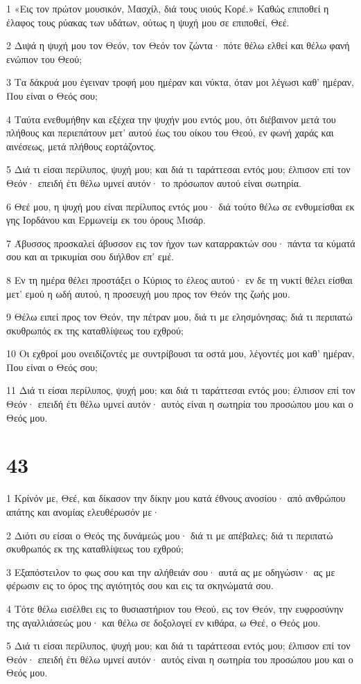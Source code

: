 \par 1 «Εις τον πρώτον μουσικόν, Μασχίλ, διά τους υιούς Κορέ.» Καθώς επιποθεί η έλαφος τους ρύακας των υδάτων, ούτως η ψυχή μου σε επιποθεί, Θεέ.
\par 2 Διψά η ψυχή μου τον Θεόν, τον Θεόν τον ζώντα· πότε θέλω ελθεί και θέλω φανή ενώπιον του Θεού;
\par 3 Τα δάκρυά μου έγειναν τροφή μου ημέραν και νύκτα, όταν μοι λέγωσι καθ' ημέραν, Που είναι ο Θεός σου;
\par 4 Ταύτα ενεθυμήθην και εξέχεα την ψυχήν μου εντός μου, ότι διέβαινον μετά του πλήθους και περιεπάτουν μετ' αυτού έως του οίκου του Θεού, εν φωνή χαράς και αινέσεως, μετά πλήθους εορτάζοντος.
\par 5 Διά τι είσαι περίλυπος, ψυχή μου; και διά τι ταράττεσαι εντός μου; έλπισον επί τον Θεόν· επειδή έτι θέλω υμνεί αυτόν· το πρόσωπον αυτού είναι σωτηρία.
\par 6 Θεέ μου, η ψυχή μου είναι περίλυπος εντός μου· διά τούτο θέλω σε ενθυμείσθαι εκ γης Ιορδάνου και Ερμωνείμ εκ του όρους Μισάρ.
\par 7 Άβυσσος προσκαλεί άβυσσον εις τον ήχον των καταρρακτών σου· πάντα τα κύματά σου και αι τρικυμίαι σου διήλθον επ' εμέ.
\par 8 Εν τη ημέρα θέλει προστάξει ο Κύριος το έλεος αυτού· εν δε τη νυκτί θέλει είσθαι μετ' εμού η ωδή αυτού, η προσευχή μου προς τον Θεόν της ζωής μου.
\par 9 Θέλω ειπεί προς τον Θεόν, την πέτραν μου, διά τι με ελησμόνησας; διά τι περιπατώ σκυθρωπός εκ της καταθλίψεως του εχθρού;
\par 10 Οι εχθροί μου ονειδίζοντές με συντρίβουσι τα οστά μου, λέγοντές μοι καθ' ημέραν, Που είναι ο Θεός σου;
\par 11 Διά τι είσαι περίλυπος, ψυχή μου; και διά τι ταράττεσαι εντός μου; έλπισον επί τον Θεόν· επειδή έτι θέλω υμνεί αυτόν· αυτός είναι η σωτηρία του προσώπου μου και ο Θεός μου.

\chapter{43}

\par 1 Κρίνόν με, Θεέ, και δίκασον την δίκην μου κατά έθνους ανοσίου· από ανθρώπου απάτης και ανομίας ελευθέρωσόν με·
\par 2 Διότι συ είσαι ο Θεός της δυνάμεώς μου· διά τι με απέβαλες; διά τι περιπατώ σκυθρωπός εκ της καταθλίψεως του εχθρού;
\par 3 Εξαπόστειλον το φως σου και την αλήθειάν σου· αυτά ας με οδηγώσιν· ας με φέρωσιν εις το όρος της αγιότητός σου και εις τα σκηνώματά σου.
\par 4 Τότε θέλω εισέλθει εις το θυσιαστήριον του Θεού, εις τον Θεόν, την ευφροσύνην της αγαλλιάσεώς μου· και θέλω σε δοξολογεί εν κιθάρα, ω Θεέ, ο Θεός μου.
\par 5 Διά τι είσαι περίλυπος, ψυχή μου; και διά τι ταράττεσαι εντός μου; έλπισον επί τον Θεόν· επειδή έτι θέλω υμνεί αυτόν· αυτός είναι η σωτηρία του προσώπου μου και ο Θεός μου.

